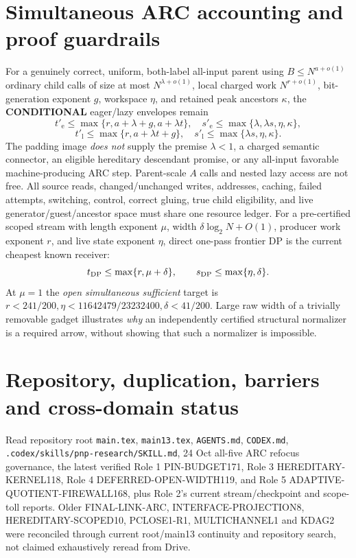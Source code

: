 \documentclass[11pt]{article}
\begin{document}
\section*{Simultaneous ARC accounting and proof guardrails}
For a genuinely correct, uniform, both-label all-input parent using $B\le N^{a+o(1)}$ ordinary child calls of size at most $N^{\lambda+o(1)}$, local charged work $N^{r+o(1)}$, bit-generation exponent $g$, workspace $\eta$, and retained peak ancestors $\kappa$, the \textbf{CONDITIONAL} eager/lazy envelopes remain
\[
t'_{\mathrm e}\le\max\{r,a+\lambda+g,a+\lambda t\},
\quad s'_{\mathrm e}\le\max\{\lambda,\lambda s,\eta,\kappa\},
\]
\[
t'_{\mathrm l}\le\max\{r,a+\lambda t+g\},
\quad s'_{\mathrm l}\le\max\{\lambda s,\eta,\kappa\}.
\]
The padding image \emph{does not} supply the premise $\lambda<1$, a charged semantic connector, an eligible hereditary descendant promise, or any all-input favorable machine-producing ARC step. Parent-scale $A$ calls and nested lazy access are not free. All source reads, changed/unchanged writes, addresses, caching, failed attempts, switching, control, correct gluing, true child eligibility, and live generator/guest/ancestor space must share one resource ledger. For a pre-certified scoped stream with length exponent $\mu$, width $\delta\log_2N+O(1)$, producer work exponent $r$, and live state exponent $\eta$, direct one-pass frontier DP is the current cheapest known receiver:
\[
t_{\rm DP}\le\max\{r,\mu+\delta\},\qquad
s_{\rm DP}\le\max\{\eta,\delta\}.
\]
At $\mu=1$ the \emph{open simultaneous sufficient} target is
$r<241/200,\eta<11642479/23232400,\delta<41/200$.
Large raw width of a trivially removable gadget illustrates \emph{why} an independently certified structural normalizer is a required arrow, without showing that such a normalizer is impossible.

\section*{Repository, duplication, barriers and cross-domain status}
Read repository root \texttt{main.tex}, \texttt{main13.tex}, \texttt{AGENTS.md}, \texttt{CODEX.md}, \texttt{.codex/skills/pnp-research/SKILL.md}, 24 Oct all-five ARC refocus governance, the latest verified Role 1 PIN-BUDGET171, Role 3 HEREDITARY-KERNEL118, Role 4 DEFERRED-OPEN-WIDTH119, and Role 5 ADAPTIVE-QUOTIENT-FIREWALL168, plus Role 2's current stream/checkpoint and scope-toll reports. Older FINAL-LINK-ARC, INTERFACE-PROJECTION8, HEREDITARY-SCOPED10, PCLOSE1-R1, MULTICHANNEL1 and KDAG2 were reconciled through current root/main13 continuity and repository search, not claimed exhaustively reread from Drive.
\end{document}
